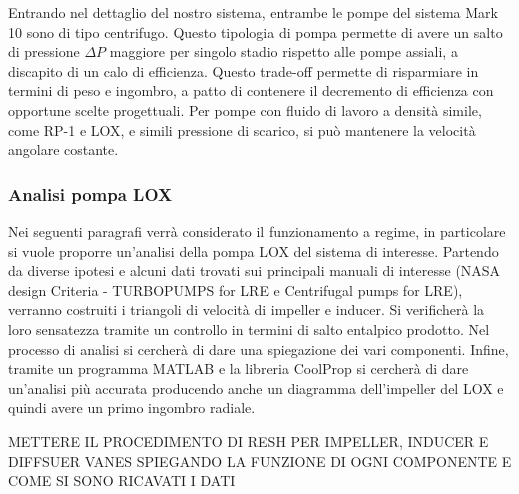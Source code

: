 Entrando nel dettaglio del nostro sistema, entrambe le pompe del sistema Mark 10 sono di tipo centrifugo. Questo tipologia di pompa permette di avere un salto di pressione $\Delta P$ maggiore per singolo stadio rispetto alle pompe assiali, a discapito di un calo di efficienza. Questo trade-off permette di risparmiare in termini di peso e ingombro, a patto di contenere il decremento di efficienza con opportune scelte progettuali. Per pompe con fluido di lavoro a densità simile, come RP-1 e LOX, e simili pressione di scarico, si può mantenere la velocità angolare costante. 




\subsubsection{Analisi pompa LOX}
Nei seguenti paragrafi verrà considerato il funzionamento a regime, in particolare si vuole proporre un'analisi della pompa LOX del sistema di interesse. Partendo da diverse ipotesi e alcuni dati trovati sui principali manuali di interesse (NASA design Criteria - TURBOPUMPS for LRE e Centrifugal pumps for LRE), verranno costruiti i triangoli di velocità di impeller e inducer. Si verificherà la loro sensatezza tramite un controllo in termini di salto entalpico prodotto. Nel processo di analisi si cercherà di dare una spiegazione dei vari componenti. Infine, tramite un programma MATLAB e la libreria CoolProp si cercherà di dare un'analisi più accurata producendo anche un diagramma dell'impeller del LOX e quindi avere un primo ingombro radiale. 

METTERE IL PROCEDIMENTO DI RESH PER IMPELLER, INDUCER E DIFFSUER VANES SPIEGANDO LA FUNZIONE DI OGNI COMPONENTE E COME SI SONO RICAVATI I DATI 



